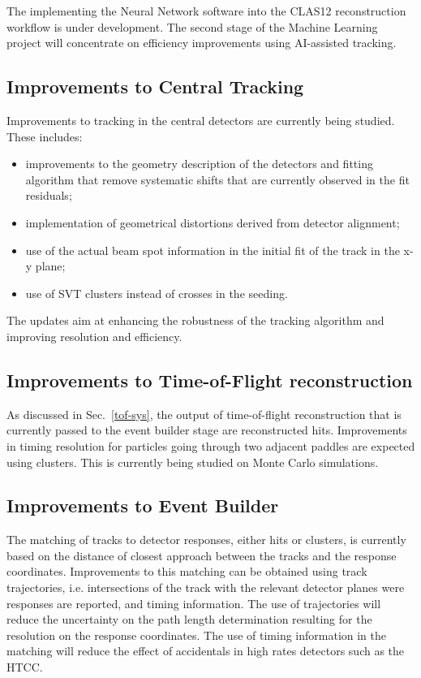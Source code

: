 The implementing the Neural Network software into the CLAS12 reconstruction workflow is under development. The second stage of the Machine Learning project will concentrate on efficiency improvements using AI-assisted tracking.

\subsection{Improvements to Central Tracking}
Improvements to tracking in the central detectors are currently being studied. These includes:
\begin{itemize}
    \item improvements to the geometry description of the detectors and fitting algorithm that remove systematic shifts that are currently observed in the fit residuals;
    \item implementation of geometrical distortions derived from detector alignment;
    \item use of the actual beam spot information in the initial fit of the track in the x-y plane;
    \item use of SVT clusters instead of crosses in the seeding.
\end{itemize}
The updates aim at enhancing the robustness of the tracking algorithm and improving resolution and efficiency.

\subsection{Improvements to Time-of-Flight reconstruction}
As discussed in Sec.~\ref{tof-sys}, the output of time-of-flight reconstruction that is currently passed to the event builder stage are reconstructed hits. Improvements in timing resolution for particles going through two adjacent paddles are expected using clusters. This is currently being studied on Monte Carlo simulations.

\subsection{Improvements to Event Builder}
The matching of tracks to detector responses, either hits or clusters, is currently based on the distance of closest approach between the tracks and the response coordinates. Improvements to this matching can be obtained using track trajectories, i.e. intersections of the track with the relevant detector planes were responses are reported, and timing information. The use of trajectories will reduce the uncertainty on the path length determination resulting for the resolution on the response coordinates. The use of timing information in the matching will reduce the effect of accidentals in high rates detectors such as the HTCC.


